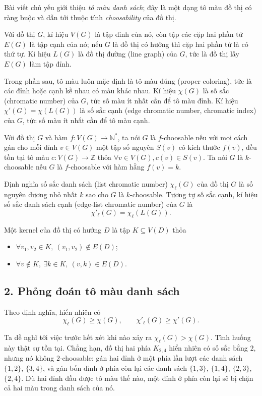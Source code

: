 \documentclass[11pt]{article}
\begin{document}
Bài viết chủ yếu giới thiệu \emph{tô màu danh sách}; đây là một dạng tô màu đồ
thị có ràng buộc và dẫn tới thuộc tính \emph{choosability} của đồ thị.

Với đồ thị \(G\), kí hiệu \(V(G)\) là tập đỉnh của nó, còn tập các cặp hai phần
tử \(E(G)\) là tập cạnh của nó; nếu \(G\) là đồ thị có hướng thì cặp hai phần
tử là có thứ tự. Kí hiệu \(L(G)\) là đồ thị đường (line graph) của \(G\), tức
là đồ thị lấy \(E(G)\) làm tập đỉnh.

Trong phần sau, tô màu luôn mặc định là tô màu đúng (proper coloring), tức là
các đỉnh hoặc cạnh kề nhau có màu khác nhau. Kí hiệu \(\chi(G)\) là số sắc
(chromatic number) của \(G\), tức số màu ít nhất cần để tô màu đỉnh. Kí hiệu
\(\chi'(G)=\chi(L(G))\) là số sắc cạnh (edge chromatic number, chromatic index)
của \(G\), tức số màu ít nhất cần để tô màu cạnh.

Với đồ thị \(G\) và hàm \(f:V(G)\to\mathbb N^*\), ta nói \(G\) là
\(f\)-choosable nếu với mọi cách gán cho mỗi đỉnh \(v\in V(G)\) một tập số
nguyên \(S(v)\) có kích thước \(f(v)\), đều tồn tại tô màu
\(c:V(G)\to\mathbb Z\) thỏa \(\forall v\in V(G), c(v)\in S(v)\). Ta nói \(G\)
là \(k\)-choosable nếu \(G\) là \(f\)-choosable với hàm hằng \(f(v)=k\).

Định nghĩa số sắc danh sách (list chromatic number) \(\chi_{\ell}(G)\) của
đồ thị \(G\) là số nguyên dương nhỏ nhất \(k\) sao cho \(G\) là
\(k\)-choosable. Tương tự số sắc cạnh, kí hiệu số sắc danh sách cạnh
(edge-list chromatic number) của \(G\) là
\[
  \chi'_{\ell}(G)=\chi_{\ell}(L(G)).
\]

Một kernel của đồ thị có hướng \(D\) là tập \(K\subseteq V(D)\) thỏa
\begin{itemize}
\item \(\forall v_1,v_2\in K,\ (v_1,v_2)\notin E(D)\);
\item \(\forall v\notin K,\ \exists k\in K,\ (v,k)\in E(D)\).
\end{itemize}

\subsection*{2. Phỏng đoán tô màu danh sách}

Theo định nghĩa, hiển nhiên có
\[
  \chi_{\ell}(G)\ge \chi(G),\qquad
  \chi'_{\ell}(G)\ge \chi'(G).
\]

Ta dễ nghĩ tới việc trước hết xét khi nào xảy ra
\(\chi_{\ell}(G)>\chi(G)\). Tình huống này thật sự tồn tại. Chẳng hạn, đồ thị
hai phía \(K_{2,4}\) hiển nhiên có số sắc bằng \(2\), nhưng nó không
\(2\)-choosable: gán hai đỉnh ở một phía lần lượt các danh sách
\(\{1,2\}\), \(\{3,4\}\), và gán bốn đỉnh ở phía còn lại các danh sách
\(\{1,3\}\), \(\{1,4\}\), \(\{2,3\}\), \(\{2,4\}\). Dù hai đỉnh đầu được tô màu
thế nào, một đỉnh ở phía còn lại sẽ bị chặn cả hai màu trong danh sách của nó.
\end{document}
